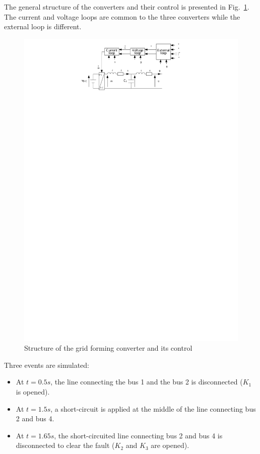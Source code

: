 \documentclass[a4paper, 12pt]{report}
\begin{document}
The general structure of the converters and their control is presented in Fig.~\ref{GFTaoufik}. The current and voltage loops are common to the three converters while the external loop is different.
\begin{figure}[htbp]
\begin{center}
\includegraphics[width=\textwidth]{Schema_Structure_Grid_Forming_and_Control_Taoufik}
\end{center}
\caption{Structure of the grid forming converter and its control\label{GFTaoufik}}
\end{figure}
Three events are simulated:
\begin{itemize}
\item At $t = 0.5s$, the line connecting the bus 1 and the bus 2 is disconnected ($K_1$ is opened).
\item At $t = 1.5s$, a short-circuit is applied at the middle of the line connecting bus 2 and bus 4.
\item At $t = 1.65s$, the short-circuited line connecting bus 2 and bus 4 is disconnected to clear the fault ($K_2$ and $K_3$ are opened).
\end{itemize}
\end{document}
